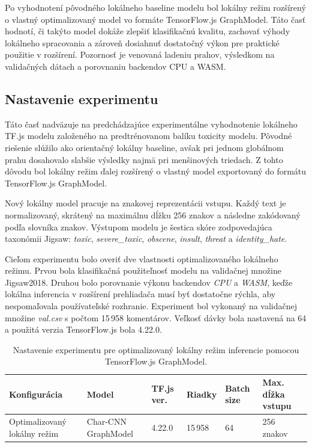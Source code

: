Po vyhodnotení pôvodného lokálneho baseline modelu bol lokálny režim rozšírený o vlastný optimalizovaný model vo formáte TensorFlow.js GraphModel. Táto časť hodnotí, či takýto model dokáže zlepšiť klasifikačnú kvalitu, zachovať výhody lokálneho spracovania a zároveň dosiahnuť dostatočný výkon pre praktické použitie v rozšírení. Pozornosť je venovaná ladeniu prahov, výsledkom na validačných dátach a porovnaniu backendov CPU a WASM.

\subsection{Nastavenie experimentu}
Táto časť nadväzuje na predchádzajúce experimentálne vyhodnotenie lokálneho TF.js modelu založeného na predtrénovanom balíku toxicity modelu. Pôvodné riešenie slúžilo ako orientačný lokálny baseline, avšak pri jednom globálnom prahu dosahovalo slabšie výsledky najmä pri menšinových triedach. Z tohto dôvodu bol lokálny režim ďalej rozšírený o vlastný model exportovaný do formátu TensorFlow.js GraphModel.

Nový lokálny model pracuje na znakovej reprezentácii vstupu. Každý text je normalizovaný, skrátený na maximálnu dĺžku 256 znakov a následne zakódovaný podľa slovníka znakov. Výstupom modelu je šestica skóre zodpovedajúca taxonómii Jigsaw: \emph{toxic}, \emph{severe\_toxic}, \emph{obscene}, \emph{insult}, \emph{threat} a \emph{identity\_hate}.

Cieľom experimentu bolo overiť dve vlastnosti optimalizovaného lokálneho režimu. Prvou bola klasifikačná použiteľnosť modelu na validačnej množine Jigsaw2018. Druhou bolo porovnanie výkonu backendov \emph{CPU} a \emph{WASM}, keďže lokálna inferencia v rozšírení prehliadača musí byť dostatočne rýchla, aby nespomaľovala používateľské rozhranie. Experiment bol vykonaný na validačnej množine \emph{val.csv} s počtom 15\,958 komentárov. Veľkosť dávky bola nastavená na 64 a použitá verzia TensorFlow.js bola 4.22.0.

\FloatBarrier
\begin{table}[!htbp]
  \centering
  \small
  \renewcommand{\arraystretch}{1.15}
  \setlength{\tabcolsep}{6pt}
  \begin{tabularx}{\textwidth}{|p{3cm}|Y|Y|Y|Y|Y|}
    \hline
    \textbf{Konfigurácia} &
    \textbf{Model} &
    \textbf{TF.js ver.} &
    \textbf{Riadky} &
    \textbf{Batch size} &
    \textbf{Max. dĺžka vstupu} \\
    \hline
    Optimalizovaný lokálny režim &
    Char-CNN GraphModel &
    4.22.0 &
    15\,958 &
    64 &
    256 znakov \\
    \hline
  \end{tabularx}
  \caption[Nastavenie lokálneho Char-CNN experimentu]{Nastavenie experimentu pre optimalizovaný lokálny režim inferencie pomocou TensorFlow.js GraphModel.}
  \label{tab:local_charcnn_eval_setup}
\end{table}
\FloatBarrier

